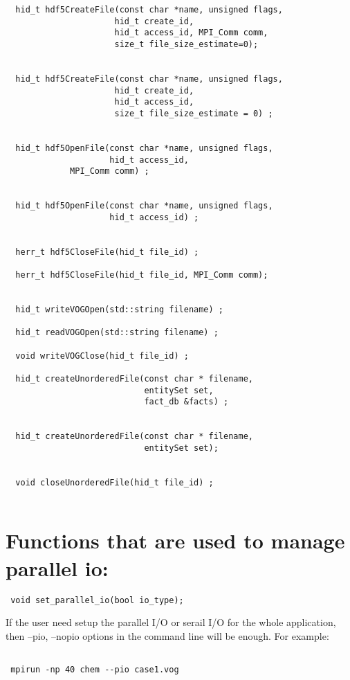 \documentclass{article}
\begin{document}
\begin{lstlisting}
  hid_t hdf5CreateFile(const char *name, unsigned flags,
                      hid_t create_id,
                      hid_t access_id, MPI_Comm comm,
                      size_t file_size_estimate=0);
 
 
  hid_t hdf5CreateFile(const char *name, unsigned flags,
                      hid_t create_id,
                      hid_t access_id,
                      size_t file_size_estimate = 0) ;
 

  hid_t hdf5OpenFile(const char *name, unsigned flags,
                     hid_t access_id,
		     MPI_Comm comm) ;


  hid_t hdf5OpenFile(const char *name, unsigned flags,
                     hid_t access_id) ;

 
  herr_t hdf5CloseFile(hid_t file_id) ;
  
  herr_t hdf5CloseFile(hid_t file_id, MPI_Comm comm);

 
  hid_t writeVOGOpen(std::string filename) ;
  
  hid_t readVOGOpen(std::string filename) ;
  
  void writeVOGClose(hid_t file_id) ;
 
  hid_t createUnorderedFile(const char * filename,
                            entitySet set,
                            fact_db &facts) ;
  
  
  hid_t createUnorderedFile(const char * filename,
                            entitySet set);
  
 
  void closeUnorderedFile(hid_t file_id) ;
  

\end{lstlisting}

\section{Functions that are used to manage parallel io:}

\begin{lstlisting}
 void set_parallel_io(bool io_type);

\end{lstlisting}
 If the user need setup the parallel I/O or serail I/O for the whole application, then --pio, --nopio options in the command line will be enough.   
 For example:
 \begin{lstlisting}

 mpirun -np 40 chem --pio case1.vog

\end{lstlisting}
\end{document}
